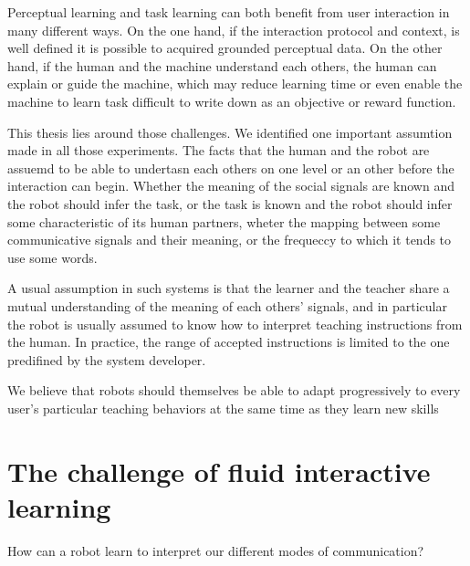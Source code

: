 Perceptual learning and task learning can both benefit from user interaction in many different ways. On the one hand, if the interaction protocol and context, is well defined it is possible to acquired grounded perceptual data. On the other hand, if the human and the machine understand each others, the human can explain or guide the machine, which may reduce learning time or even enable the machine to learn task difficult to write down as an objective or reward function.




This thesis lies around those challenges. We identified one important assumtion made in all those experiments. The facts that the human and the robot are assuemd to be able to undertasn each others on one level or an other before the interaction can begin. Whether the meaning of the social signals are known and the robot should infer the task, or the task is known and the robot should infer some characteristic of its human partners, wheter the mapping between some communicative signals and their meaning, or the frequeccy to which it tends to use some words.


A usual assumption in such
systems is that the learner and the teacher share a mutual
understanding of the meaning of each others' signals, and in
particular the robot is usually assumed to know how to interpret
teaching instructions from the human. In practice, the range
of accepted instructions is limited to the one predifined by the
system developer.

 We believe that robots should themselves be
able to adapt progressively to every user's particular teaching
behaviors at the same time as they learn new skills

\section{The challenge of fluid interactive learning}



How can a robot learn to interpret our different modes of communication? 

